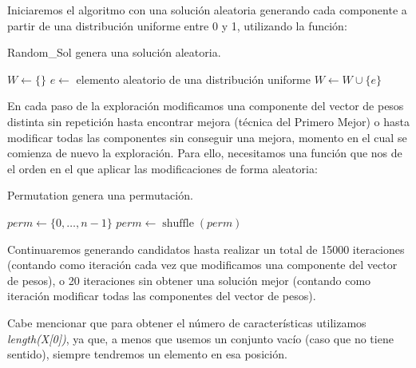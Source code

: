 \documentclass[11pt,a4paper]{article}
\begin{document}
Iniciaremos el algoritmo con una solución aleatoria generando cada componente a partir de una distribución uniforme entre 0 y 1, utilizando la función: \\
\begin{algorithm}[H]
	\caption{{\sc Random\_Sol} genera una solución aleatoria.}
	
	$W \gets \{\}$ \;
	 {
		$e \gets$ elemento aleatorio de una distribución uniforme \;
		$W \gets W \cup \{e\}$ \;
	}
	 \;
\end{algorithm}

En cada paso de la exploración modificamos una componente del vector de pesos distinta sin repetición hasta encontrar mejora (técnica del Primero Mejor) o hasta modificar todas las componentes sin conseguir una mejora, momento en el cual se comienza de nuevo la exploración. Para ello, necesitamos una función que nos de el orden en el que aplicar las modificaciones de forma aleatoria: \\
\begin{algorithm}[H]
	\caption{{\sc Permutation} genera una permutación.}
	
	$perm \gets \{0, \dots, n-1\}$ \;
	$perm \gets \operatorname{shuffle}(perm)$ \;
	 \;
\end{algorithm}

Continuaremos generando candidatos hasta realizar un total de 15000 iteraciones (contando como iteración cada vez que modificamos una componente del vector de pesos), o 20 iteraciones sin obtener una solución mejor (contando como iteración modificar todas las componentes del vector de pesos).

Cabe mencionar que para obtener el número de características utilizamos \emph{length(X[0])}, ya que, a menos que usemos un conjunto vacío (caso que no tiene sentido), siempre tendremos un elemento en esa posición.
\end{document}
